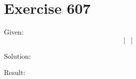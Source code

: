 \documentclass[a4paper, 10pt]{scrartcl}
\begin{document}
\section{Exercise 607}

Given:
\[
\left|
    \begin{array}{ccc}
    \end{array}
\right|
\]

Solution:

Result:
\end{document}
